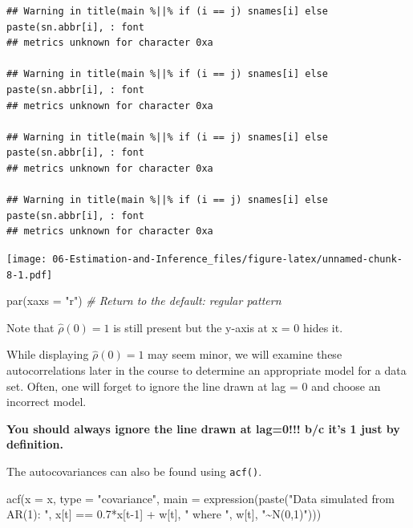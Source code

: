 \documentclass[
]{book}
\newenvironment{Shaded}{\begin{snugshade}}{\end{snugshade}}
\newcommand{\AttributeTok}[1]{\textcolor[rgb]{0.77,0.63,0.00}{#1}}
\newcommand{\CommentTok}[1]{\textcolor[rgb]{0.56,0.35,0.01}{\textit{#1}}}
\newcommand{\DecValTok}[1]{\textcolor[rgb]{0.00,0.00,0.81}{#1}}
\newcommand{\FloatTok}[1]{\textcolor[rgb]{0.00,0.00,0.81}{#1}}
\newcommand{\FunctionTok}[1]{\textcolor[rgb]{0.00,0.00,0.00}{#1}}
\newcommand{\NormalTok}[1]{#1}
\newcommand{\SpecialCharTok}[1]{\textcolor[rgb]{0.00,0.00,0.00}{#1}}
\newcommand{\StringTok}[1]{\textcolor[rgb]{0.31,0.60,0.02}{#1}}
\theoremstyle{definition}
\theoremstyle{definition}
\theoremstyle{definition}
\theoremstyle{definition}
\theoremstyle{remark}
\begin{document}
\begin{verbatim}
## Warning in title(main %||% if (i == j) snames[i] else paste(sn.abbr[i], : font
## metrics unknown for character 0xa

## Warning in title(main %||% if (i == j) snames[i] else paste(sn.abbr[i], : font
## metrics unknown for character 0xa

## Warning in title(main %||% if (i == j) snames[i] else paste(sn.abbr[i], : font
## metrics unknown for character 0xa

## Warning in title(main %||% if (i == j) snames[i] else paste(sn.abbr[i], : font
## metrics unknown for character 0xa
\end{verbatim}

\texttt{[image: 06-Estimation-and-Inference\_files/figure-latex/unnamed-chunk-8-1.pdf]}

\begin{Shaded}
\begin{Highlighting}[]
\FunctionTok{par}\NormalTok{(}\AttributeTok{xaxs =} \StringTok{"r"}\NormalTok{) }\CommentTok{\# Return to the default: regular pattern}
\end{Highlighting}
\end{Shaded}

Note that \(\hat{\rho}(0)=1\) is still present but the y-axis at x = 0 hides it.

While displaying \(\hat{\rho}(0)=1\) may seem minor, we will examine these autocorrelations later in the course to determine an appropriate model for a data set. Often, one will forget to ignore the line drawn at lag = 0 and choose an incorrect model.

\textbf{You should always ignore the line drawn at lag=0!!! b/c it's 1 just by definition.}

The autocovariances can also be found using \texttt{acf()}.

\begin{Shaded}
\begin{Highlighting}[]
\FunctionTok{acf}\NormalTok{(}\AttributeTok{x =}\NormalTok{ x, }\AttributeTok{type =} \StringTok{"covariance"}\NormalTok{, }\AttributeTok{main =} 
     \FunctionTok{expression}\NormalTok{(}\FunctionTok{paste}\NormalTok{(}\StringTok{"Data simulated from AR(1): "}\NormalTok{, x[t] }
     \SpecialCharTok{==} \FloatTok{0.7}\SpecialCharTok{*}\NormalTok{x[t}\DecValTok{{-}1}\NormalTok{] }\SpecialCharTok{+}\NormalTok{ w[t], }\StringTok{" where "}\NormalTok{, w[t], }\StringTok{"\textasciitilde{}N(0,1)"}\NormalTok{)))}
\end{Highlighting}
\end{Shaded}
\end{document}
